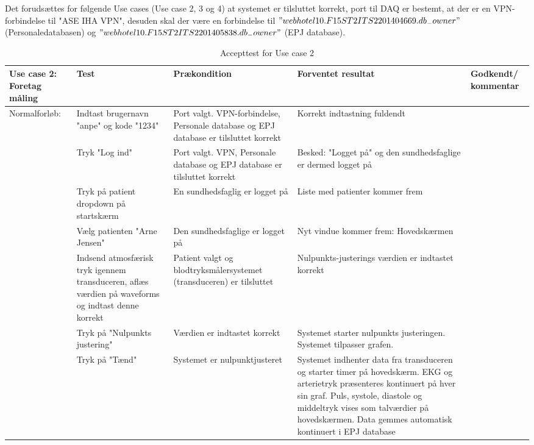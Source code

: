 Det forudsættes for følgende Use cases (Use case 2, 3 og 4) at systemet er tilsluttet korrekt, port til DAQ er bestemt, at der er en VPN-forbindelse til "ASE IHA VPN", desuden skal der være en forbindelse til $"webhotel10.F15ST2ITS2201404669.db_{-}owner"$(Personaledatabasen) og $"webhotel10.F15ST2ITS2201405838.db_{-}owner"$ (EPJ database).
\begin{table}[H]
\caption{Accepttest for Use case 2}\label{tab:tabel9}
\begin{tabular}{|>{\raggedright\arraybackslash}p{2.5cm}| >{\raggedright\arraybackslash}p{2.9cm} | >{\raggedright\arraybackslash}p{2.9cm} | >{\raggedright\arraybackslash}p{2.9cm} | >{\raggedright\arraybackslash}p{2.8cm} |}
   \hline
   \textbf{Use case 2: Foretag måling} &\textbf{Test}& \textbf{Prækondition} & \textbf{Forventet resultat} & \textbf{Godkendt/ kommentar}\\ \hline
   Normalforløb:& Indtast brugernavn "anpe" og kode "1234" & Port valgt. VPN-forbindelse, Personale database og EPJ database er tilsluttet korrekt & Korrekt indtastning fuldendt & \\\hline
   &Tryk "Log ind" & Port valgt. VPN, Personale database og EPJ database er tilsluttet korrekt & Besked: "Logget på" og den sundhedsfaglige er dermed logget på &\\\hline
   &Tryk på patient dropdown på startskærm & En sundhedsfaglig er logget på & Liste med patienter kommer frem  & \\\hline
   & Vælg patienten "Arne Jensen" & Den sundhedsfaglige er logget på & Nyt vindue kommer frem: Hovedskærmen &\\\hline
   & Indsend atmosfærisk tryk igennem transduceren, aflæs værdien på waveforms og indtast denne korrekt & Patient valgt og blodtryksmålersystemet (transduceren) er tilsluttet & Nulpunkts-justerings værdien er indtastet korrekt &\\\hline
   & Tryk på "Nulpunkts justering" & Værdien er indtastet korrekt & Systemet starter nulpunkts justeringen. Systemet tilpasser grafen. &\\\hline
   & Tryk på "Tænd"& Systemet er nulpunktjusteret & Systemet indhenter data fra transduceren og starter timer på hovedskærm. EKG og arterietryk præsenteres kontinuert på hver sin graf. Puls, systole, diastole og middeltryk vises som talværdier på hovedskærmen. Data gemmes automatisk kontinuert i EPJ database & \\\hline
\end{tabular}
\end{table}


